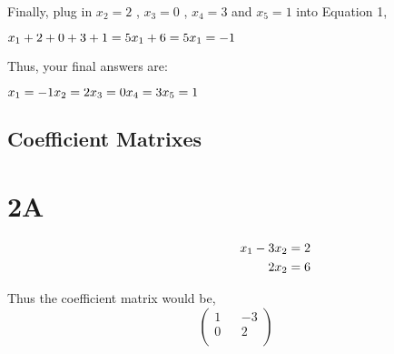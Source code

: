 \documentclass{article}
\begin{document}
\raggedright Finally, plug in \begin{math} x_2 = 2 \end{math} , \begin{math} x_3 = 0 \end{math} , \begin{math} x_4 = 3 \end{math} and \begin{math} x_5 = 1 \end{math} into Equation 1, \newline
    
    \begin{math}
        x_1 + 2 + 0 + 3 + 1 = 5 \newline
        x_1 + 6 = 5 \newline
        x_1 = -1 \newline 
    \end{math}

\raggedright Thus, your final answers are: \newline

    \begin{math}
        x_1 = -1 \newline
        x_2 = 2 \newline
        x_3 = 0 \newline
        x_4 = 3 \newline
        x_5 = 1 \newline
    \end{math}


\begin{center}{\section*{\huge{Coefficient Matrixes}}}\end{center}

\section*{2A}

\setcounter{equation}{0}

\begin{align}
    \hspace*{1.0in} 
    x_1 - 3x_2 &= 2& \\
    2x_2 &= 6&
\end{align}

\raggedright Thus the coefficient matrix would be,
\[
\begin{pmatrix}
1 && -3 \\
0 && 2 \\    
\end{pmatrix}
\]
\end{document}
